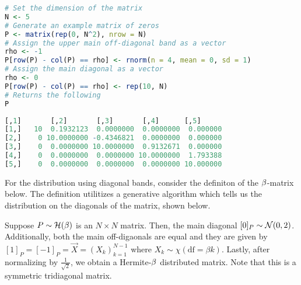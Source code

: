 \begin{lstlisting}[language=R]
# Set the dimension of the matrix
N <- 5
# Generate an example matrix of zeros
P <- matrix(rep(0, N^2), nrow = N)
# Assign the upper main off-diagonal band as a vector
rho <- -1
P[row(P) - col(P) == rho] <- rnorm(n = 4, mean = 0, sd = 1)
# Assign the main diagonal as a vector
rho <- 0
P[row(P) - col(P) == rho] <- rep(10, N)
# Returns the following
P
\end{lstlisting}
\newpage
\begin{lstlisting}[language=R]
     [,1]       [,2]       [,3]       [,4]      [,5]
[1,]   10  0.1932123  0.0000000  0.0000000  0.000000
[2,]    0 10.0000000 -0.4346821  0.0000000  0.000000
[3,]    0  0.0000000 10.0000000  0.9132671  0.000000
[4,]    0  0.0000000  0.0000000 10.0000000  1.793388
[5,]    0  0.0000000  0.0000000  0.0000000 10.000000
\end{lstlisting}


%
%

For the distribution using diagonal bands, consider the definiton of the $\beta$-matrix below.
The definition utilitizes a generative algorithm which tells us the distribution on the diagonals of the matrix, shown below.

\ALGbeta


\begin{definition}
Suppose $P \sim \mathcal{H}(\beta)$ is an $N \times N$ matrix. Then, the main diagonal $[0]_P \sim \mathcal{N}(0,2)$.
Additionally, both the main off-digaonals are equal and they are given by $[1]_{P} = [-1]_{P} = \vec{X} = (X_k)_{k=1}^{N-1}$ where $X_k \sim \chi(\text{df} = \beta k)$.
Lastly, after normalizing by $\frac{1}{\sqrt{2}}$, we obtain a Hermite-$\beta$ distributed matrix. Note that this is a symmetric tridiagonal matrix.
\end{definition}

